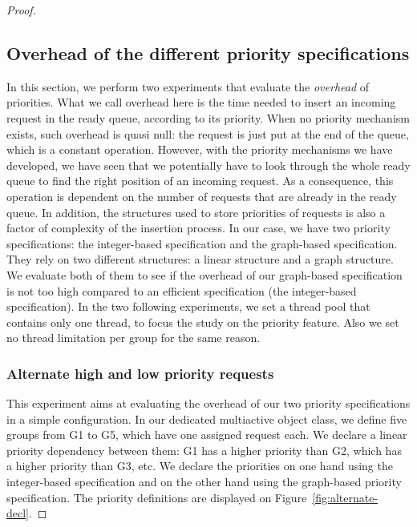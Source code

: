 \documentclass[11pt]{report}
\begin{document}
\begin{proof}
\subsection{Overhead of the different priority specifications}
In this section, we perform two experiments that evaluate the \emph{overhead} of priorities. What we call overhead here is the time needed to insert an incoming request in the ready queue, according to its priority. When no priority mechanism exists, such overhead is quasi null: the request is just put at the end of the queue, which is a constant operation. However, with the priority mechanisms we have developed, we have seen that we potentially have to look through the whole ready queue to find the right position of an incoming request. As a consequence, this operation is dependent on the number of requests that are already in the ready queue. In addition, the structures used to store priorities of requests is also a factor of complexity of the insertion process. In our case, we have two priority specifications: the integer-based specification and the graph-based specification. They rely on two different structures: a linear structure and a graph structure. We evaluate both of them to see if the overhead of our graph-based specification is not too high compared to an efficient specification (the integer-based specification). In the two following experiments, we set a thread pool that contains only one thread, to focus the study on the priority feature. Also we set no thread limitation per group for the same reason.

\subsubsection{Alternate high and low priority requests}
This experiment aims at evaluating the overhead of our two priority specifications in a simple configuration. In our dedicated multiactive object class, we define five groups from G1 to G5, which have one assigned request each. We declare a linear priority dependency between them: G1 has a higher priority than G2, which has a higher priority than G3, etc. We declare the priorities on one hand using the integer-based specification and on the other hand using the graph-based priority specification. The priority definitions are displayed on Figure~\ref{fig:alternate-decl}.


\end{proof}
\end{document}
